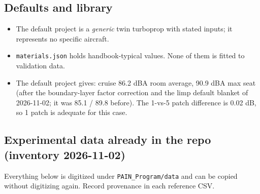\documentclass[10pt,a4paper]{article}
\begin{document}
\subsection*{Defaults and library}

\begin{itemize}
\item The default project is a \emph{generic} twin turboprop with stated inputs; it represents no specific aircraft.
\item \texttt{materials.\allowbreak{}json} holds handbook-typical values. None of them is fitted to validation data.
\item The default project gives: cruise 86.2 dBA room average, 90.9 dBA max seat (after the boundary-layer factor correction and the limp default blanket of 2026-11-02; it was 85.1 / 89.8 before). The 1-vs-5 patch difference is 0.02 dB, so 1 patch is adequate for this case.
\end{itemize}

\subsection*{Experimental data already in the repo (inventory 2026-11-02)}

Everything below is digitized under \texttt{PAIN\_\allowbreak{}Program/\allowbreak{}data} and can be copied without digitizing again. Record provenance in each reference CSV.
\end{document}
